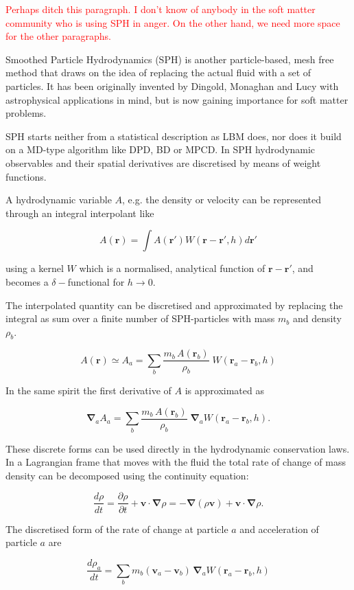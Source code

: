 \documentclass[8.5pt,twoside,twocolumn]{article}
\newcommand{\beq}{\begin{equation}}
\newcommand{\eeq}{\end{equation}}
\newcommand{\com}[1]{\textcolor{red}{#1}}
\begin{document}
\com{Perhaps ditch this paragraph. I don't know of anybody in the soft matter community who is using SPH in anger.
On the other hand, we need more space for the other paragraphs.}

Smoothed Particle Hydrodynamics (SPH) is another particle-based, mesh free method
that draws on the idea of replacing the actual fluid with a set of particles.
It has been originally invented by Dingold, Monaghan and Lucy
with astrophysical applications in mind, but is now gaining importance for soft matter
problems.

SPH starts neither from a statistical description as LBM does, nor does it
build on a MD-type algorithm like DPD, BD or MPCD. In SPH hydrodynamic observables 
and their spatial derivatives are discretised by means of 
weight functions.

A hydrodynamic variable $A$, e.g. the density or velocity can be represented 
through an integral interpolant like  

\beq
A(\mathbf{r})=\int A(\mathbf{r'}) W(\mathbf{r}-\mathbf{r'},h ) d\mathbf{r'}
\eeq

using a kernel $W$ which is a normalised, analytical function of $\mathbf{r}-\mathbf{r'}$,
 and becomes a $\delta-$functional for $h\to0$.  

The interpolated quantity can be discretised and approximated by replacing the integral 
as sum over a finite number of SPH-particles with mass $m_b$ and density $\rho_b$.

\beq
A(\mathbf{r})\simeq A_a= \sum_b \frac{m_b\, A(\mathbf{r}_b)}{\rho_b} \;W(\mathbf{r}_a-\mathbf{r}_b, h)
\eeq

In the same spirit the first derivative of $A$ is approximated as

\beq
\mathbf{\nabla}_a A_a= \sum_b \frac{m_b\, A(\mathbf{r}_b)}{\rho_b} \;\mathbf{\nabla}_aW(\mathbf{r}_a-\mathbf{r}_b, h).
\eeq

These discrete forms can be used directly in the hydrodynamic conservation laws.
In a Lagrangian frame that moves with the fluid the total rate of 
change of mass density can be decomposed using the continuity equation:

\beq
\frac{d\rho}{dt}=\frac{\partial\rho}{\partial t} + \mathbf{v}\cdot\mathbf{\nabla}\rho =-\mathbf{\nabla}(\rho \mathbf{v})+\mathbf{v}\cdot\mathbf{\nabla}\rho.
\eeq

The discretised form of the rate of change at particle $a$ and acceleration of particle $a$ are

\beq
\frac{d\rho_a}{dt}=\sum_b m_b (\mathbf{v}_a-\mathbf{v}_b)\,\mathbf{\nabla}_a W(\mathbf{r}_a-\mathbf{r}_b,h)
\eeq
\end{document}
